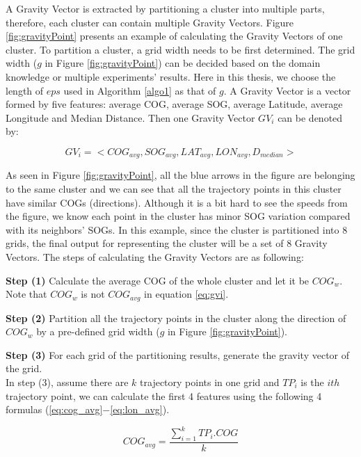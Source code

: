 \documentclass[12pt,glossary]{dalcsthesis}
\begin{document}
A Gravity Vector is extracted by partitioning a cluster into multiple parts, therefore, each cluster can contain multiple Gravity Vectors. Figure \ref{fig:gravityPoint} presents an example of calculating the Gravity Vectors of one cluster. To partition a cluster, a grid width needs to be first determined. The grid width ($g$ in Figure \ref{fig:gravityPoint}) can be decided based on the domain knowledge or multiple experiments' results. Here in this thesis, we choose the length of $eps$ used in Algorithm \ref{algo1} as that of $g$. A Gravity Vector is a vector formed by five features: average COG, average SOG, average Latitude, average Longitude and Median Distance. Then one Gravity Vector $GV_i$ can be denoted by:

\begin{equation} 
\label{eq:gvi}
GV_i = <COG_{avg},SOG_{avg},LAT_{avg},LON_{avg},D_{median}>
\end{equation}

As seen in Figure \ref{fig:gravityPoint}, all the blue arrows in the figure are belonging to the same cluster and we can see that all the trajectory points in this cluster have similar COGs (directions). Although it is a bit hard to see the speeds from the figure, we know each point in the cluster has minor SOG variation compared with its neighbors' SOGs. In this example, since the cluster is partitioned into 8 grids, the final output for representing the cluster will be a set of 8 Gravity Vectors. The steps of calculating the Gravity Vectors are as following:

\textbf{Step (1)} Calculate the average COG of the whole cluster and let it be $COG_w$. Note that $COG_w$ is not $COG_{avg}$ in equation \ref{eq:gvi}.

\textbf{Step (2)} Partition all the trajectory points in the cluster along the direction of $COG_w$ by a pre-defined grid width ($g$ in Figure \ref{fig:gravityPoint}). 

\textbf{Step (3)} For each grid of the partitioning results, generate the gravity vector of the grid. \\

In step (3), assume there are $k$ trajectory points in one grid and $TP_i$ is the $ith$ trajectory point, we can calculate the first 4 features using the following 4 formulas (\ref{eq:cog_avg}$-$\ref{eq:lon_avg}). 


\begin{equation} 
\label{eq:cog_avg}
COG_{avg} = \frac{\sum_{i=1}^k TP_i.COG}{k}
\end{equation}
\end{document}
